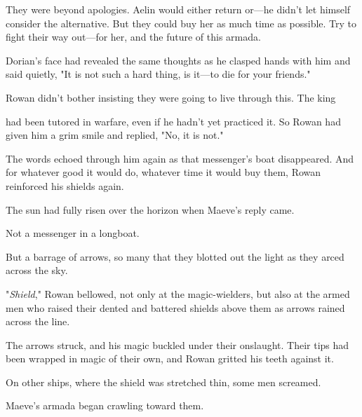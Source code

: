 They were beyond apologies. Aelin would either return or---he didn't let himself consider the alternative. But they could buy her as much time as possible. Try to fight their way out---for her, and the future of this armada.

Dorian's face had revealed the same thoughts as he clasped hands with him and said quietly, "It is not such a hard thing, is it---to die for your friends."

Rowan didn't bother insisting they were going to live through this. The king

had been tutored in warfare, even if he hadn't yet practiced it. So Rowan had given him a grim smile and replied, "No, it is not."

The words echoed through him again as that messenger's boat disappeared. And for whatever good it would do, whatever time it would buy them, Rowan reinforced his shields again.

The sun had fully risen over the horizon when Maeve's reply came.

Not a messenger in a longboat.

But a barrage of arrows, so many that they blotted out the light as they arced across the sky.

"\emph{Shield}," Rowan bellowed, not only at the magic-wielders, but also at the armed men who raised their dented and battered shields above them as arrows rained across the line.

The arrows struck, and his magic buckled under their onslaught. Their tips had been wrapped in magic of their own, and Rowan gritted his teeth against it.

On other ships, where the shield was stretched thin, some men screamed.

Maeve's armada began crawling toward them.
